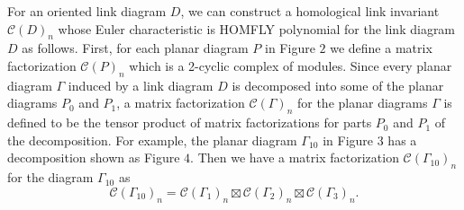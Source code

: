 \documentclass[10pt]{amsart}
\theoremstyle{break}
\begin{document}
\indent For an oriented link diagram $D$, we can construct a homological link invariant ${{\mathcal{C}}}(D)_n$ whose Euler characteristic is HOMFLY polynomial for the link diagram $D$ as follows. 
First, for each planar diagram $P$ in Figure $2$ we define a matrix factorization ${{\mathcal{C}}}\acute{}(P)_n$ which is a 2-cyclic complex of modules.
Since every planar diagram $\Gamma$ induced by a link diagram $D$ is decomposed into some of the planar diagrams $P_0$ and $P_1$, a matrix factorization ${{\mathcal{C}}}\acute{}(\Gamma)_n$ for the planar diagrams $\Gamma$ is defined to be the tensor product of matrix factorizations for parts $P_0$ and $P_1$ of the decomposition. 
For example, the planar diagram $\Gamma_{10}$ in Figure $3$ has a decomposition shown as Figure $4$. Then we have a matrix factorization ${{\mathcal{C}}}\acute{}(\Gamma_{10})_n$ for the diagram $\Gamma_{10}$ as
\begin{equation*}
{{\mathcal{C}}}\acute{}(\Gamma_{10})_n= {{\mathcal{C}}}\acute{}(\Gamma_1)_n\boxtimes{{\mathcal{C}}}\acute{}(\Gamma_2)_n\boxtimes{{\mathcal{C}}}\acute{}(\Gamma_3)_n.
\end{equation*}
\end{document}
